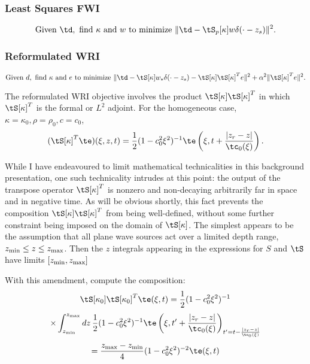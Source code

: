 \subsubsection{Least Squares FWI}

\begin{equation}
  \label{eqn:defolspw}
  \mbox{Given } \td, \mbox{ find }\kappa \mbox{ and }w \mbox{ to
    minimize }
  \| \td -  \tS_p[\kappa]w\delta(\cdot-z_s)\|^2.
\end{equation}

\subsubsection{Reformulated WRI}

\begin{equation}
  \label{eqn:defwrireformpw}
  \mbox{Given } d, \mbox{ find }\kappa \mbox{ and }e \mbox{ to
    minimize }
  \| \td -  \tS[\kappa]w_*\delta(\cdot-z_s) - \tS[\kappa]\tS[\kappa]^Te\|^2+\alpha^2\|\tS[\kappa]^Te\|^2.
\end{equation}
                              
The reformulated WRI objective involves 
the product $\tS[\kappa]\tS[\kappa]^T$ in which $\tS[\kappa]^T$ is the
formal or $L^2$ adjoint. For the homogeneous case,
$\kappa=\kappa_0,\rho=\rho_0,c=c_0$,
\begin{equation}
  \label{eqn:stmodhompwtrans}
  (\tS[\kappa]^T\te)(\xi,z,t)=\frac{1}{2}(1-c_0^2\xi^2)^{-1}\te\left(\xi,t +
    \frac{|z_r-z|}{\tc_0(\xi)}\right).
\end{equation}

While I have endeavoured to limit mathematical technicalities in this background
presentation, one such technicality intrudes at this point: the
output of the transpose operator $\tS[\kappa]^T$ is nonzero and non-decaying arbitrarily
far in space and in negative time. As will be obvious shortly, this
fact prevents the composition $\tS[\kappa]\tS[\kappa]^T$ from being
well-defined, without some further constraint being imposed on the
domain of $\tS[\kappa]$. The simplest appears to be the assumption
that all plane wave sources act over a limited depth range, $z_{\rm min} \le z
\le z_{\rm max}$. Then the $z$ integrals appearing in the expressions
for $S$ and $\tS$ have limits $[z_{\rm min},z_{\rm max}]$

With this amendment, compute the composition:
\[
  \tS[\kappa_0]\tS[\kappa_0]^T\te(\xi,t) = \frac{1}{2}(1-c_0^2\xi^2)^{-1}
\]
\[
  \times 
  \int_{z_{\rm min}}^{z_{\rm max}} dz\, \frac{1}{2}(1-c_0^2\xi^2)^{-1}\te\left(\xi,t' +
    \frac{|z_r-z|}{\tc_0(\xi)}\right)_{t'=t-\frac{|z_r-z|}{\tc_0(\xi)}}
\]
\begin{equation}
  \label{eqn:stmodhompwnorm}
 = \frac{z_{\rm max}-z_{\rm min}}{4}(1-c_0^2\xi^2)^{-2}\te(\xi,t) 
\end{equation}

